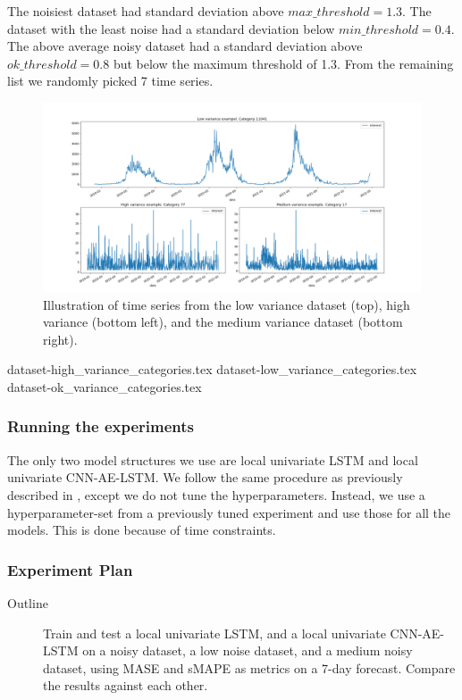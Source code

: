 The noisiest dataset had standard deviation above $max\_threshold = 1.3$.
The dataset with the least noise had a standard deviation below $min\_threshold = 0.4$.
The above average noisy dataset had a standard deviation above $ok\_threshold = 0.8$
but below the maximum threshold of 1.3.
From the remaining list we randomly picked 7 time series.

\begin{figure}[h!]
  \centering
  \includegraphics[width=\textwidth]{./figs/code_generated/time-series-variance-examples.png}
  \hfill
  \caption{Illustration of time series from the low variance dataset (top), high variance (bottom left), and the medium variance dataset (bottom right).}
  \label{fig:time-series-variance-examples}
\end{figure}

{dataset-high_variance_categories.tex}
{dataset-low_variance_categories.tex}
{dataset-ok_variance_categories.tex}

\subsubsection{Running the experiments}
The only two model structures we use are local univariate LSTM
and local univariate CNN-AE-LSTM.
We follow the same procedure as previously described in ,
except we do not tune the hyperparameters. Instead, we
use a hyperparameter-set from a previously tuned experiment and use those for all the models.
This is done because of time constraints.

\subsubsection{Experiment Plan}
\begin{description}
  \item[Outline]{
              Train and test a local univariate LSTM,
              and a local univariate CNN-AE-LSTM on a noisy dataset, a low noise dataset, and a medium noisy dataset,
              using MASE and sMAPE as metrics on a 7-day forecast.
              Compare the results against each other.
        }
\end{description}

